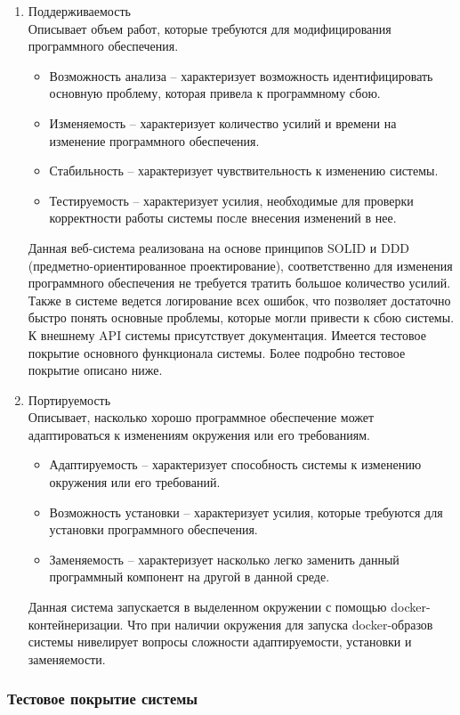 \documentclass[a4paper,14pt]{extreport} %
\begin{document}
\begin{enumerate}
\item Поддерживаемость \\
Описывает объем работ, которые требуются для модифицирования программного обеспечения.
\begin{itemize}
\item Возможность анализа -- характеризует возможность идентифицировать основную проблему, которая привела к программному сбою.
\item Изменяемость -- характеризует количество усилий и времени на изменение программного обеспечения.
\item Стабильность -- характеризует чувствительность к изменению системы.
\item Тестируемость -- характеризует усилия, необходимые для проверки корректности работы системы после внесения изменений в нее.
\end{itemize}
Данная веб-система реализована на основе принципов SOLID и DDD (предметно-ориентированное проектирование), соответственно для изменения программного обеспечения не требуется тратить большое количество усилий. Также в системе ведется логирование всех ошибок, что позволяет достаточно быстро понять основные проблемы, которые могли привести к сбою системы. К внешнему API системы присутствует документация. Имеется тестовое покрытие основного функционала системы. Более подробно тестовое покрытие описано ниже.
\item Портируемость \\
Описывает, насколько хорошо программное обеспечение может адаптироваться к изменениям окружения или его требованиям.
\begin{itemize}
\item Адаптируемость -- характеризует способность системы к изменению окружения или его требований.
\item Возможность установки -- характеризует усилия, которые требуются для установки программного обеспечения.
\item Заменяемость -- характеризует насколько легко заменить данный программный компонент на другой в данной среде.
\end{itemize}
Данная система запускается в выделенном окружении с помощью docker-контейнеризации. Что при наличии окружения для запуска docker-образов системы нивелирует вопросы сложности адаптируемости, установки и заменяемости.
\end{enumerate}

\subsubsection{Тестовое покрытие системы}
\end{document}
